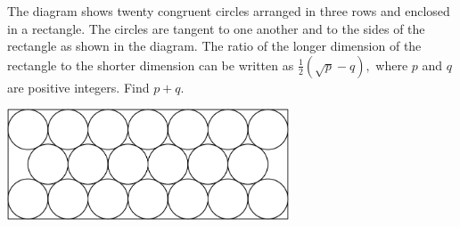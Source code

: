 The diagram shows twenty congruent circles arranged in three rows and enclosed in a rectangle.  The circles are tangent to one another and to the sides of the rectangle as shown in the diagram.  The ratio of the longer dimension of the rectangle to the shorter dimension can be written as $\frac{1}{2}\left(\sqrt{p}-q\right),$ where $p$ and $q$ are positive integers.  Find $p+q.$

\begin{center}
\includegraphics[width = 83.60000000000001mm]{img/fig0.png}
\end{center}